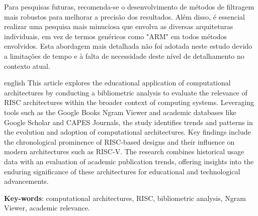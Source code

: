 \documentclass[
	article,			%
	11pt,				%
	oneside,			%
	a4paper,			%
	english,			%
	brazil,				%
	sumario=tradicional
	]{abntex2}
\begin{document}
Para pesquisas futuras, recomenda-se o desenvolvimento de métodos de filtragem mais robustos para melhorar a precisão dos resultados. Além disso, é essencial realizar uma pesquisa mais minuciosa que envolva as diversas arquiteturas individuais, em vez de termos genéricos como "ARM" em todos métodos envolvidos. Esta abordagem mais detalhada não foi adotada neste estudo devido a limitações de tempo e à falta de necessidade deste nível de detalhamento no contexto atual.

\postextual



\emptythanks
\maketitle

\renewcommand{\resumoname}{Abstract}
\begin{resumoumacoluna}
 \begin{otherlanguage*}{english}
   This article explores the educational application of computational architectures by conducting a bibliometric analysis to evaluate the relevance of RISC architectures within the broader context of computing systems. Leveraging tools such as the Google Books Ngram Viewer and academic databases like Google Scholar and CAPES Journals, the study identifies trends and patterns in the evolution and adoption of computational architectures. Key findings include the chronological prominence of RISC-based designs and their influence on modern architectures such as RISC-V. The research combines historical usage data with an evaluation of academic publication trends, offering insights into the enduring significance of these architectures for educational and technological advancements.
   \vspace{\onelineskip}
 
   \noindent
   \textbf{Key-words}: computational architectures, RISC, bibliometric analysis, Ngram Viewer, academic relevance.
 \end{otherlanguage*}  
\end{resumoumacoluna}





\begin{apendicesenv}
\end{apendicesenv}
\begin{anexosenv}
\end{anexosenv}
\end{document}
